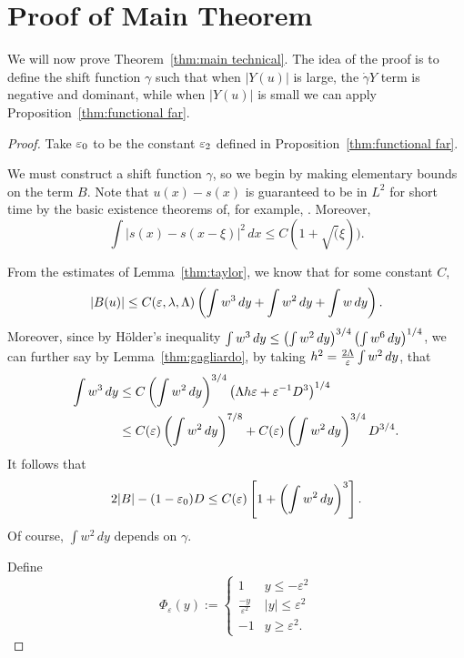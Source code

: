 \section{Proof of Main Theorem} \label{sec:main thm}

We will now prove Theorem~\ref{thm:main technical}.  The idea of the proof is to define the shift function $\gamma$ such that when $|Y(u)|$ is large, the $\dot{\gamma} Y$ term is negative and dominant, while when $|Y(u)|$ is small we can apply Proposition~\ref{thm:functional far}.  
\begin{proof}
Take $\varepsilon_0$ to be the constant $\varepsilon_2$ defined in Proposition~\ref{thm:functional far}.  

We must construct a shift function $\gamma$, so we begin by making elementary bounds on the term $B$.  Note that $u(x)-s(x)$ is guaranteed to be in $L^2$ for short time by the basic existence theorems of, for example, \cite{Se}. Moreover,
\begin{equation} \label{continuity in gamma}
\int |s(x) - s(x-\xi)|^2 \,dx \leq C (1+\sqrt(\xi)). 
\end{equation}

From the estimates of Lemma~\ref{thm:taylor}, we know that for some constant $C$,
\[ |B(u)| \leq C(\varepsilon, \lambda, \Lambda) \left( \int w^3 \,dy + \int w^2 \,dy + \int w \,dy \right). \]
Moreover, since by H\"{o}lder's inequality $\int w^3 \,dy \leq \left( \int w^2 \,dy \right)^{3/4} \left( \int w^6 \,dy \right)^{1/4}$, we can further say by Lemma~\ref{thm:gagliardo}, by taking $h^2 = \frac{2 \Lambda}{\varepsilon} \int w^2 \,dy$, that
\begin{align*} 
\int w^3 \,dy &\leq C \left( \int w^2 \,dy \right)^{3/4} \left(  \Lambda h \varepsilon + \varepsilon^{-1} D^3 \right)^{1/4}
\\ &\leq C(\varepsilon) \left( \int w^2 \,dy \right)^{7/8} + C(\varepsilon)\left( \int w^2 \,dy \right)^{3/4} D^{3/4}.
\end{align*}
It follows that
\begin{equation} \label{nonlinear gamma lipschitz}
2|B|-(1-\varepsilon_0) D \leq C(\varepsilon) \left[ 1 + \left( \int w^2 \,dy \right)^3 \right]. 
\end{equation}
Of course, $\int w^2 \,dy$ depends on $\gamma$.  

Define
\[ \Phi_\varepsilon(y) := 
\begin{cases} 
1 & y\leq -\varepsilon^2 \\
\frac{-y}{\varepsilon^2} & |y|\leq \varepsilon^2 \\
-1 & y\geq \varepsilon^2.
\end{cases} \]


\end{proof}
